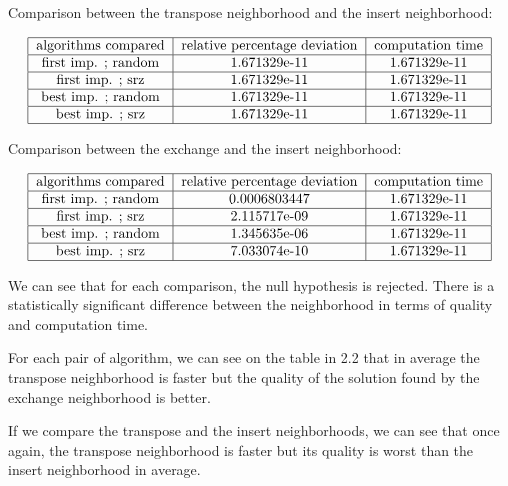 \documentclass{article}
\begin{document}
Comparison between the transpose neighborhood and the insert neighborhood:

\begin{align*}
\begin{tabular} {|c|c|c|c|c|} \hline
    algorithms compared & relative percentage deviation & computation time \\ \hline
    first imp. ; random & 1.671329e-11 & 1.671329e-11 \\ \hline
    first imp. ; srz & 1.671329e-11 & 1.671329e-11 \\ \hline
    best imp. ; random & 1.671329e-11 & 1.671329e-11 \\ \hline
    best imp. ; srz & 1.671329e-11 & 1.671329e-11 \\ \hline
\end{tabular}
\end{align*}

Comparison between the exchange and the insert neighborhood:

\begin{align*}
\begin{tabular} {|c|c|c|c|c|} \hline
    algorithms compared & relative percentage deviation & computation time \\ \hline
    first imp. ; random & 0.0006803447 & 1.671329e-11 \\ \hline
    first imp. ; srz & 2.115717e-09 & 1.671329e-11 \\ \hline
    best imp. ; random & 1.345635e-06 & 1.671329e-11 \\ \hline
    best imp. ; srz & 7.033074e-10 & 1.671329e-11 \\ \hline
\end{tabular}
\end{align*}

We can see that for each comparison, the null hypothesis is rejected.
There is a statistically significant difference between the neighborhood in terms of quality and computation time. \newline

For each pair of algorithm, we can see on the table in 2.2 that in average the transpose neighborhood is faster but the quality of the solution found by the exchange neighborhood is better. \newline

If we compare the transpose and the insert neighborhoods, we can see that once again, the transpose neighborhood is faster but its quality is worst than the insert neighborhood in average. \newline
\end{document}
